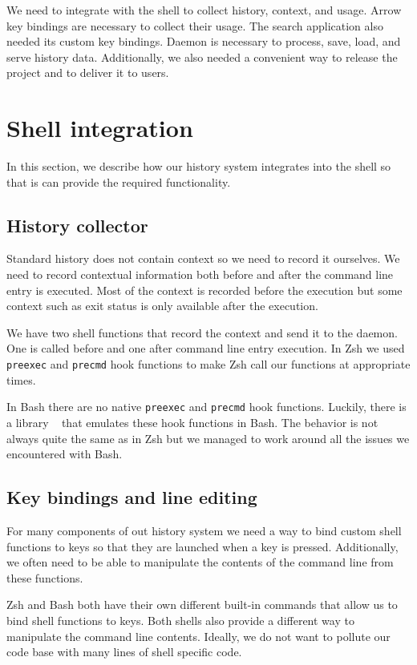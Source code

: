 \documentclass[thesis=M,english]{FITthesis}[2012/10/20]
\let\myCite\cite
\renewcommand\cite{\unskip~\myCite}
\begin{document}
We need to integrate with the shell to collect history, context, and usage. Arrow key bindings are necessary to collect their usage. The search application also needed its custom key bindings. Daemon is necessary to process, save, load, and serve history data. Additionally, we also needed a convenient way to release the project and to deliver it to users.

\section{Shell integration}

In this section, we describe how our history system integrates into the shell so that is can provide the required functionality. 

\subsection{History collector}

Standard history does not contain context so we need to record it ourselves. 
We need to record contextual information both before and after the command line entry is executed. Most of the context is recorded before the execution but some context such as exit status is only available after the execution. 

We have two shell functions that record the context and send it to the daemon. One is called before and one after command line entry execution. In Zsh we used \verb|preexec| and \verb|precmd| hook functions to make Zsh call our functions at appropriate times. 

In Bash there are no native \verb|preexec| and \verb|precmd| hook functions. Luckily, there is a library \cite{lib-bash-preexec} that emulates these hook functions in Bash. The behavior is not always quite the same as in Zsh but we managed to work around all the issues we encountered with Bash.  

\subsection{Key bindings and line editing}

For many components of out history system we need a way to bind custom shell functions to keys so that they are launched when a key is pressed. Additionally, we often need to be able to manipulate the contents of the command line from these functions.

Zsh and Bash both have their own different built-in commands that allow us to bind shell functions to keys. Both shells also provide a different way to manipulate the command line contents. Ideally, we do not want to pollute our code base with many lines of shell specific code.
\end{document}
